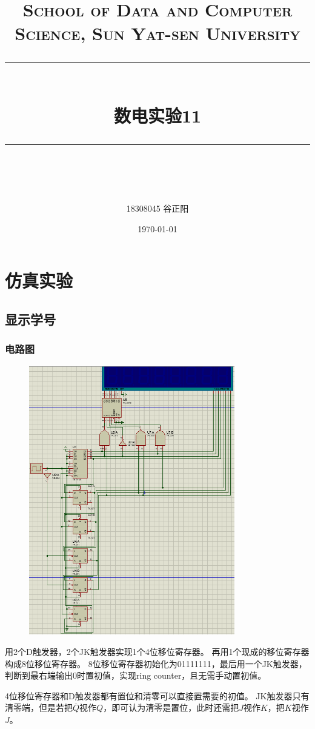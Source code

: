 \documentclass[UTF8, a4paper, 11pt]{article}
\title{	
\normalfont \normalsize
\textsc{School of Data and Computer Science, Sun Yat-sen University} \\ [25pt] %
\rule{\textwidth}{0.5pt} \\[0.4cm] %
\huge 数电实验11\\ %
\rule{\textwidth}{2pt} \\[0.5cm] %
\author{18308045 谷正阳}
\date{\normalsize\today}
}
\begin{document}
\maketitle
\tableofcontents
\newpage
\section{仿真实验}
\subsection{显示学号}
\subsubsection{电路图}
\begin{figure}[H]
    \centering
    \includegraphics[width=0.8\textwidth]{ex11.1电路图.png}
\end{figure}
用2个D触发器，2个JK触发器实现1个4位移位寄存器。
再用1个现成的移位寄存器构成8位移位寄存器。
8位移位寄存器初始化为01111111，最后用一个JK触发器，判断到最右端输出0时置初值，实现ring counter，且无需手动置初值。

4位移位寄存器和D触发器都有置位和清零可以直接置需要的初值。
JK触发器只有清零端，但是若把$\overline Q$视作$Q$，即可认为清零是置位，此时还需把$J$视作$K$，把$K$视作$J$。
\end{document}
